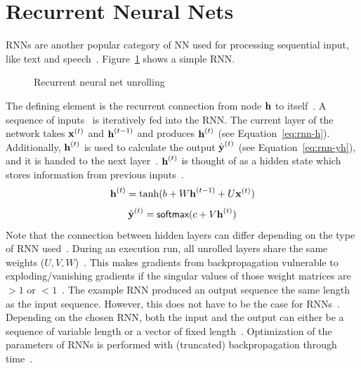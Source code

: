\section{Recurrent Neural Nets}
\acp{RNN} are another popular category of \ac{NN} used for processing sequential input,
like text and speech~\citep{chauhan_review_2018}.
Figure~\ref{fig:rnn-unrolling} shows a simple \ac{RNN}.
\begin{figure}[ht]
    \centering
    \caption[Simple recurrent neural net]{%
        Recurrent neural net unrolling~\citep{goodfellow_deep_2016}\label{fig:rnn-unrolling}
    }
\end{figure}
The defining element is the recurrent connection from node $\textbf{h}$ to
itself~\citep{goodfellow_deep_2016}.
A sequence of inputs \X\ is iteratively fed into the \ac{RNN}.
The current layer of the network takes $\textbf{x}^{(t)}$ and $\textbf{h}^{(t-1)}$ and produces $\textbf{h}^{(t)}$
(see Equation~\ref{eq:rnn-h}).
Additionally, $\textbf{h}^{(t)}$ is used to calculate the output $\hat{\textbf{y}}^{(t)}$ (see
Equation~\ref{eq:rnn-yh}), and it is handed to the next layer~\citep{goodfellow_deep_2016}.
$\textbf{h}^{(t)}$ is thought of as a hidden state which stores information from previous
inputs~\citep{goodfellow_deep_2016}.
\begin{equation}\label{eq:rnn-h}
    \textbf{h}^{(t)} = \tanh(b+W\textbf{h}^{(t-1)}+U\textbf{x}^{(t)})
\end{equation}
\begin{equation}\label{eq:rnn-yh}
    \hat{\textbf{y}}^{(t)} = \textsf{softmax}(c + V\textbf{h}^{(t)})
\end{equation}
Note that the connection between hidden layers can differ depending on the type of \ac{RNN}
used~\citep{goodfellow_deep_2016}.
During an execution run, all unrolled layers share the same weights
($U,V,W$)~\citep{chauhan_review_2018}.
This makes gradients from backpropagation vulnerable to exploding/vanishing gradients if the
singular values of those weight matrices are $>1$ or
$<1$~\citep{goodfellow_deep_2016,pascanu_difficulty_2013}.
The example \ac{RNN} produced an output sequence the same length as the input
sequence.
However, this does not have to be the case for \acp{RNN}~\citep{goodfellow_deep_2016}.
Depending on the chosen \ac{RNN}, both the input and the output can either be a sequence of
variable length or a vector of fixed length~\citep{goodfellow_deep_2016}.
Optimization of the parameters of \acp{RNN} is performed with (truncated) backpropagation through
time~\citep{sherstinsky_fundamentals_2020}.

